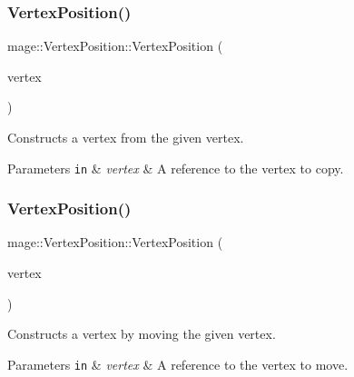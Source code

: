\subsubsection{\texorpdfstring{Vertex\+Position()}{VertexPosition()}\hspace{0.1cm}{\footnotesize\ttfamily [3/4]}}
{\footnotesize\ttfamily mage\+::\+Vertex\+Position\+::\+Vertex\+Position (\begin{DoxyParamCaption}\item[{const \hyperlink{structmage_1_1_vertex_position}{Vertex\+Position} \&}]{vertex }\end{DoxyParamCaption})\hspace{0.3cm}{\ttfamily [default]}}

Constructs a vertex from the given vertex.


\begin{DoxyParams}[1]{Parameters}
\mbox{\tt in}  & {\em vertex} & A reference to the vertex to copy. \\
\hline
\end{DoxyParams}
\hypertarget{structmage_1_1_vertex_position_ae00cb7667e411fefa4052b80a47ccfff}{}\label{structmage_1_1_vertex_position_ae00cb7667e411fefa4052b80a47ccfff} 
\subsubsection{\texorpdfstring{Vertex\+Position()}{VertexPosition()}\hspace{0.1cm}{\footnotesize\ttfamily [4/4]}}
{\footnotesize\ttfamily mage\+::\+Vertex\+Position\+::\+Vertex\+Position (\begin{DoxyParamCaption}\item[{\hyperlink{structmage_1_1_vertex_position}{Vertex\+Position} \&\&}]{vertex }\end{DoxyParamCaption})\hspace{0.3cm}{\ttfamily [default]}}

Constructs a vertex by moving the given vertex.


\begin{DoxyParams}[1]{Parameters}
\mbox{\tt in}  & {\em vertex} & A reference to the vertex to move. \\
\hline
\end{DoxyParams}
\hypertarget{structmage_1_1_vertex_position_ae78ac5fd76f3217ec72435beaa34ed6e}{}\label{structmage_1_1_vertex_position_ae78ac5fd76f3217ec72435beaa34ed6e} 
